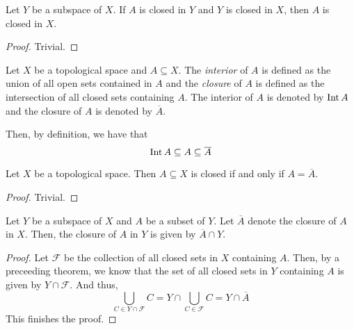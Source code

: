 \begin{corollary}
    Let $Y$ be a subspace of $X$. If $A$ is closed in $Y$ and $Y$ is closed in $X$, then $A$ is closed in $X$.
\end{corollary}
\begin{proof}
    Trivial.
\end{proof}

\begin{definition}
    Let $X$ be a topological space and $A\subseteq X$. The \textit{interior} of $A$ is defined as the union of all open sets contained in $A$ and the \textit{closure} of $A$ is defined as the intersection of all closed sets containing $A$. The interior of $A$ is denoted by $\operatorname{Int} A$ and the closure of $A$ is denoted by $\overline{A}$.
\end{definition}

Then, by definition, we have that 
\begin{equation*}
    \operatorname{Int} A\subseteq A\subseteq\overline{A}
\end{equation*}

\begin{corollary}
    Let $X$ be a topological space. Then $A\subseteq X$ is closed if and only if $A = \overline{A}$.
\end{corollary}
\begin{proof}
    Trivial.
\end{proof}

\begin{theorem}
    Let $Y$ be a subspace of $X$ and $A$ be a subset of $Y$. Let $\overline{A}$ denote the closure of $A$ in $X$. Then, the closure of $A$ in $Y$ is given by $\overline{A}\cap Y$.
\end{theorem}
\begin{proof}
    Let $\mathcal{F}$ be the collection of all closed sets in $X$ containing $A$. Then, by a preceeding theorem, we know that the set of all closed sets in $Y$ containing $A$ is given by $Y\cap\mathcal{F}$. And thus, 
    \begin{equation*}
        \bigcup_{C\in Y\cap\mathcal{F}} C = Y\cap\bigcup_{C\in\mathcal{F}}C = Y\cap\overline{A}
    \end{equation*}
    This finishes the proof.
\end{proof}

